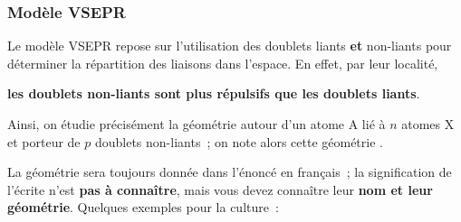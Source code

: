 \documentclass[../../main/main.tex]{subfiles}
\begin{document}
\subsubsection{Modèle VSEPR}
Le modèle VSEPR repose sur l'utilisation des doublets liants \textbf{et}
non-liants pour déterminer la répartition des liaisons dans l'espace. En effet,
par leur localité,
\begin{center}
	\textbf{les doublets non-liants sont plus répulsifs que les doublets liants}.
\end{center}
Ainsi, on étudie précisément la géométrie autour d'un atome A
lié à $n$ atomes X et porteur de $p$ doublets non-liants~; on note alors cette
géométrie .

La géométrie sera toujours donnée dans l'énoncé en français~; la signification
de l'écrite  n'est \textbf{pas à connaître}, mais vous devez
connaître leur \textbf{nom et leur géométrie}. Quelques exemples pour la
culture~:
\end{document}
